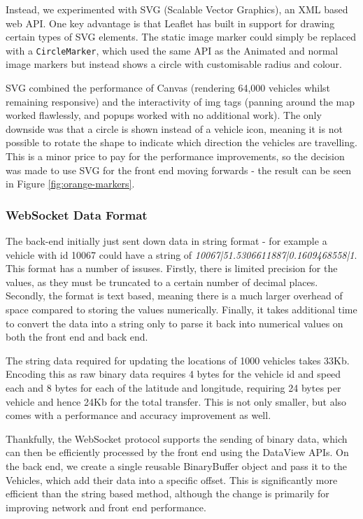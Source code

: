 \documentclass[ %
                    author={Alexander Hill},
                supervisor={Dr. Benjamin Sach},
                    degree={MEng},
                     title={MARMOSET},
                  subtitle={Multi-Agent Route Management using Online Simulation for Efficient Transportation},
                      type={research},
                      year={2016} ]{dissertation}
\begin{document}
Instead, we experimented with SVG (Scalable Vector Graphics), an XML
based web API. One key advantage is that Leaflet has built in support for
drawing certain types of SVG elements. The static image marker could simply be
replaced with a \texttt{CircleMarker}, which used the same API as the Animated
and normal image markers but instead shows a circle with customisable radius and
colour.

SVG combined the performance of Canvas (rendering 64,000 vehicles whilst
remaining responsive) and the interactivity of img tags (panning around the map
worked flawlessly, and popups worked with no additional work). The only downside
was that a circle is shown instead of a vehicle icon, meaning it is not possible
to rotate the shape to indicate which direction the vehicles are travelling.
This is a minor price to pay for the performance improvements, so the decision
was made to use SVG for the front end moving forwards - the result can be seen
in Figure \ref{fig:orange-markers}.

\subsubsection{WebSocket Data Format}

The back-end initially just sent down data in string format - for example a
vehicle with id 10067 could have a string of
\textit{10067|51.5306611887|0.1609468558|1}. This
format has a number of issuses. Firstly, there is limited precision for the
values, as they must be truncated to a certain number of decimal places.
Secondly, the format is text based, meaning there is a much larger overhead of
space compared to storing the values numerically. Finally, it takes additional
time to convert the data into a string only to parse it back into numerical
values on both the front end and back end.

The string data required for updating the locations of 1000 vehicles takes 33Kb.
Encoding this as raw binary data requires 4 bytes for the vehicle id and speed
each and 8 bytes for each of the latitude and longitude, requiring 24 bytes per
vehicle and hence 24Kb for the total transfer.  This is not only smaller, but
also comes with a performance and accuracy improvement as well.

Thankfully, the WebSocket protocol supports the sending of binary data, which
can then be efficiently processed by the front end using the DataView APIs. On
the back end, we create a single reusable BinaryBuffer object and pass it to the
Vehicles, which add their data into a specific offset. This is significantly
more efficient than the string based method, although the change is primarily
for improving network and front end performance.
\end{document}
